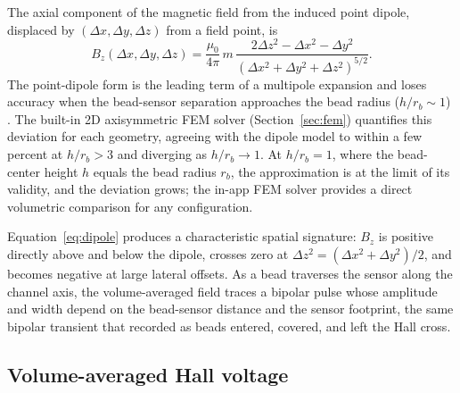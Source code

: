 \documentclass[pdflatex,sn-basic]{sn-jnl}
\theoremstyle{thmstyleone}
\theoremstyle{thmstyletwo}
\theoremstyle{thmstylethree}
\begin{document}
The axial component of the magnetic field from the induced point dipole, displaced by $(\Delta x, \Delta y, \Delta z)$ from a field point, is \citep{griffiths}
\begin{equation}
B_z(\Delta x, \Delta y, \Delta z) = \frac{\mu_0}{4\pi}\, m\, \frac{2\Delta z^2 - \Delta x^2 - \Delta y^2}{\left(\Delta x^2 + \Delta y^2 + \Delta z^2\right)^{5/2}}.
\label{eq:dipole}
\end{equation}
The point-dipole form is the leading term of a multipole expansion and loses accuracy when the bead-sensor separation approaches the bead radius ($h/r_b \sim 1$) \citep{griffiths}. The built-in 2D axisymmetric FEM solver (Section~\ref{sec:fem}) quantifies this deviation for each geometry, agreeing with the dipole model to within a few percent at $h/r_b > 3$ and diverging as $h/r_b \to 1$. At $h/r_b = 1$, where the bead-center height $h$ equals the bead radius $r_b$, the approximation is at the limit of its validity, and the deviation grows; the in-app FEM solver provides a direct volumetric comparison for any configuration.

Equation~\eqref{eq:dipole} produces a characteristic spatial signature: $B_z$ is positive directly above and below the dipole, crosses zero at $\Delta z^2 = (\Delta x^2 + \Delta y^2)/2$, and becomes negative at large lateral offsets. As a bead traverses the sensor along the channel axis, the volume-averaged field traces a bipolar pulse whose amplitude and width depend on the bead-sensor distance and the sensor footprint, the same bipolar transient that \citet{aledealat2009} recorded as beads entered, covered, and left the Hall cross.

\subsection{Volume-averaged Hall voltage}\label{sec:hallvoltage}
\end{document}
